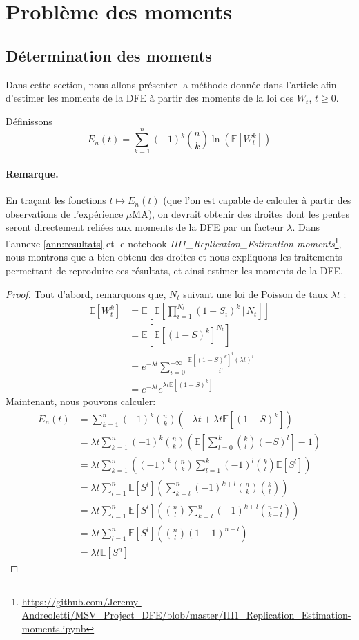 \documentclass[12pt]{article}
\newtheorem{plain}{Proposition}[section]
\newcounter{prop}[section]
\newcommand{\req}[1]{\paragraph{Remarque.}#1\vspace{0.1cm}}
\newcommand{\prop}[1]{\begin{center}\fbox{\begin{minipage}{.8\linewidth}\begin{plain} #1\end{plain}\end{minipage}}\end{center}}
\newcommand{\pth}[1]{\left(#1\right)}
\newcommand{\cro}[1]{\left[#1\right]}
\newcommand{\En}{\mathbb{N}}
\newcommand{\Esp}[1]{\mathbb{E}\cro{#1}}
\newcommand{\kt }{\,|\,}
\begin{document}
\FloatBarrier
\section{Problème des moments}

\subsection{Détermination des moments}\label{ss:det_mom}

Dans cette section, nous allons présenter la méthode donnée dans l'article afin d'estimer les moments de la DFE à partir des moments de la loi des $W_t$, $t\geqslant 0$.

Définissons \[E_n(t)=\sum_{k=1}^n(-1)^k\binom{n}{k}\ln\pth{\Esp{W_t^k}}\]

\prop{Pour $t\geqslant 0$ et $n\in\En$: \[E_n(t)=\pth{\lambda\Esp{S^n}}t\]}

\req{En traçant les fonctions $t\mapsto E_n(t)$ (que l'on est capable de calculer à partir des observations de l'expérience $\mu$MA), on devrait obtenir des droites dont les pentes seront directement reliées aux moments de la DFE par un facteur $\lambda$. Dans l'annexe \ref{ann:resultats} et le notebook \emph{III1\_Replication\_Estimation-moments}\footnote{\url{https://github.com/Jeremy-Andreoletti/MSV_Project_DFE/blob/master/III1_Replication_Estimation-moments.ipynb}}, nous montrons que \cite{rob} a bien obtenu des droites et nous expliquons les traitements permettant de reproduire ces résultats, et ainsi estimer les moments de la DFE.}

\begin{proof}
  Tout d'abord, remarquons que, $N_t$ suivant une loi de Poisson de taux $\lambda t$ :
  \begin{align*}
    \Esp{W_t^k}&=\Esp{\Esp{\prod_{i=1}^{N_t}(1-S_i)^k\kt N_t}}\\
    &=\Esp{\Esp{(1-S)^k}^{N_t}}\\
    &=e^{-\lambda t}\sum_{i=0}^{+\infty}\frac{\Esp{(1-S)^k}^i(\lambda t)^i}{i!}\\
    &=e^{-\lambda t}e^{\lambda t\Esp{(1-S)^k}}
  \end{align*}
  Maintenant, nous pouvons calculer:
  \begin{align*}
    E_n(t)&=\sum_{k=1}^n(-1)^k\binom{n}{k}\pth{-\lambda t+\lambda t\Esp{(1-S)^k}}\\
    &=\lambda t\sum_{k=1}^n(-1)^k\binom{n}{k}\pth{\Esp{\sum_{l=0}^k\binom{k}{l}\pth{-S}^l}-1}\\
    &=\lambda t\sum_{k=1}^n\pth{(-1)^k\binom{n}{k}\sum_{l=1}^k(-1)^l\binom{k}{l}\Esp{S^l}}\\
    &=\lambda t\sum_{l=1}^n\Esp{S^l}\pth{\sum_{k=l}^n(-1)^{k+l}\binom{n}{k}\binom{k}{l}}\\
    &=\lambda t\sum_{l=1}^n\Esp{S^l}\pth{\binom{n}{l}\sum_{k=l}^n(-1)^{k+l}\binom{n-l}{k-l}}\\
    &=\lambda t\sum_{l=1}^n\Esp{S^l}\pth{\binom{n}{l}(1-1)^{n-l}}\\
    &=\lambda t\Esp{S^n}
  \end{align*}
\end{proof}
\end{document}
